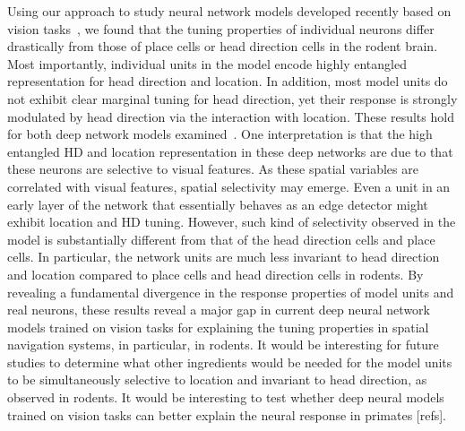 \documentclass[11pt]{article}
\begin{document}
Using our approach to study neural network models developed recently based on vision tasks~\cite{Luo2024,Gornet2024automated}, we found that the tuning properties of individual neurons differ drastically from those of place cells or head direction cells in the rodent brain. %
Most importantly, individual units in the model encode highly entangled representation for head direction and location. In addition, most model units do not exhibit clear marginal tuning for head direction, yet their response is strongly modulated by head direction via the interaction with location. These results hold for both deep network models examined~\cite{Luo2024,Gornet2024}.
One interpretation is that the high entangled HD and location representation in these deep networks are due to that these neurons are selective to visual features. As these spatial variables are correlated with visual features, spatial selectivity may emerge.
Even a unit in an early layer of the network that essentially behaves as an edge detector might exhibit location and HD tuning.  However, such kind of selectivity observed in the model is substantially different from that of the head direction cells and place cells.
In particular, the network units are much less invariant to head direction and location compared to place cells and head direction cells in rodents.
By revealing a fundamental divergence in the response properties of model units and real neurons, 
these results reveal a major gap in current deep neural network models trained on vision tasks for explaining the tuning properties in spatial navigation systems, in particular, in rodents.  It would be interesting for future studies to determine what other ingredients would be needed for the model units to be simultaneously selective to location and invariant to head direction, as observed in rodents. It would be interesting to test whether deep neural models trained on vision tasks can better explain the neural response in primates [refs].




\end{document}
